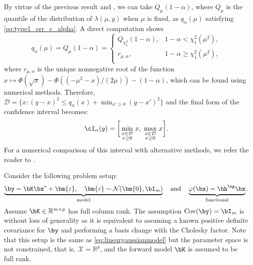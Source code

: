 \documentclass[11pt]{article}
\numberwithin{equation}{section}
\numberwithin{figure}{section}
\begin{document}
By virtue of the previous result and , we can take $Q_{\mu}(1-\alpha)$, where $Q_\mu$ is the quantile of the distribution of $\lambda(\mu, y)$ when $\mu$ is fixed, as $q_\alpha(\mu)$ satisfying \eqref{eq:type1_err_c_alpha}. 
A direct computation shows
\begin{equation} \label{eq:1d_quantile_func}
q_\alpha(\mu) = Q_{\mu}(1-\alpha) = \begin{cases}
      Q_{\chi^2_1}(1-\alpha), & 1-\alpha < \chi^2_1(\mu^2), \\
        r_{\mu, \alpha}, & 1-\alpha \geq \chi^2_1(\mu^2), \\ 
\end{cases}
\end{equation}
where $r_{\mu, \alpha}$ is the unique nonnegative root of the function $x \mapsto \Phi(\sqrt{x}) - \Phi({(-\mu^2-x)}/(2\mu)) - (1-\alpha)$, which can be found using numerical methods.
Therefore, $\mathcal D = \{x: (y-x)^2 \leq q_\alpha(x) + \min_{x' \geq 0} (y-x')^2 \}$ and the final form of the confidence interval becomes:
\begin{equation*}
 \cI_\alpha(y) = \bigg [ \min_{\substack{x \in \mathcal D \\ x \geq 0}} \, x ,\; \max_{\substack{x \in \mathcal D \\ x \geq 0}} \, x \bigg].
\end{equation*}
For a numerical comparison of this interval with alternative methods, we refer the reader to .

Consider the following problem setup:
\begin{equation}\label{eq:lineargaussianmodel-unconstrained}
\underbrace{\by = \bK\bx^* + \bm{\varepsilon}, \quad \bm{\varepsilon} \sim \mathcal{N}(\bm{0}, \bI_m)}_{\text{model}} \quad \text{and} \quad \underbrace{\varphi(\bx) = \bh^\tp \bx}_{\text{functional}}.
\end{equation}
Assume $\bK \in \mathbb{R}^{m \times p}$ has full column rank.
The assumption $\text{Cov}(\by) = \bI_m$ is without loss of generality as it is equivalent to assuming a known positive definite covariance for $\by$ and performing a basis change with the Cholesky factor. 
Note that this setup is the same as \eqref{eq:lineargaussianmodel} but the parameter space is not constrained, that is, $\mathcal X = \mathbb{R}^p$, and the forward model $\bK$ is assumed to be full rank. 
\end{document}
